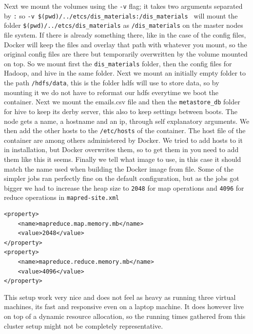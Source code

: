 \documentclass[runningheads,a4paper]{llncs}
\begin{document}
Next we mount the volumes using the \verb!-v! flag; it takes two arguments separated by \verb!:! so \verb!-v $(pwd)/../etcs/dis_materials:/dis_materials ! will mount the folder \verb!$(pwd)/../etcs/dis_materials! as \verb!/dis_materials! on the master nodes file system. If there is already something there, like in the case of the config files, Docker will keep the files and overlay that path with whatever you mount, so the original config files are there but temporarily overwritten by the volume mounted on top. So we mount first the \verb!dis_materials! folder, then the config files for Hadoop, and hive in the same folder. Next we mount an initially empty folder to the path \verb!/hdfs/data!, this is the folder hdfs will use to store data, so by mounting it we do not have to reformat our hdfs everytime we boot the container. Next we mount the emails.csv file and then the \verb!metastore_db! folder for hive to keep its derby server, this also to keep settings between boots.
\newline
The node gets a name, a hostname and an ip, through self explanatory arguments. We then add the other hosts to the \verb!/etc/hosts! of the container. The host file of the container are among others administered by Docker. We tried to add hosts to it in installation, but Docker overwrites them, so to get them in you need to add them like this it seems. Finally we tell what image to use, in this case it should match the name used when building the Docker image from file. \cite{dockerdocs}
\newline
Some of the simpler jobs ran perfectly fine on the default configuration, but as the jobs got bigger we had to increase the heap size to \verb!2048! for map operations and \verb!4096! for reduce operations in  \verb!mapred-site.xml!
\begin{verbatim}
<property>
    <name>mapreduce.map.memory.mb</name>
    <value>2048</value>
</property>
<property>
    <name>mapreduce.reduce.memory.mb</name>
    <value>4096</value>
</property>
\end{verbatim}
This setup work very nice and does not feel as heavy as running three virtual machines, its fast and responsive even on a laptop machine. It does however live on top of a dynamic resource allocation, so the running times gathered from this cluster setup might not be completely representative.
\end{document}
